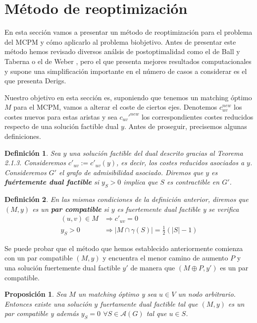 \documentclass[twoside,a4paper,openright,12pt,tikz]{book}
\newtheorem{defi}{Definici\'on}[section]
\newtheorem{prop}{Proposici\'on}[section]
\begin{document}
\section{Método de reoptimización}
En esta sección vamos a presentar un método de reoptimización para el problema del MCPM y cómo aplicarlo al problema biobjetivo. Antes de presentar este método hemos revisado diversos análsis de postoptimalidad como el de Ball y Taberna \cite{balltab} o el de Weber \cite{webber}, pero el que presenta mejores resultados computacionales y supone una simplificación importante en el número de casos a considerar es el que presenta Derigs. 

Nuestro objetivo en esta sección es, suponiendo que tenemos un matching óptimo $M$ para el MCPM, vamos a alterar el coste de ciertos ejes. Denotemos $c_{uv}^{new}$ los costes nuevos para estas aristas y sea $c_{uv}'^{new}$ los correspondientes costes reducidos respecto de una solución factible dual $y$. Antes de proseguir, precisemos algunas definiciones.
\begin{defi}
Sea $y$ una solución factible del dual descrito gracias al Teorema 2.1.3. Consideremos $c'_{uv}:=c'_{uv}(y)$, es decir, los costes reducidos asociados a $y$. Consideremos $G'$ el grafo de admisibilidad asociado. Diremos que $y$ es \textbf{fuértemente dual factible} si $y_S>0$ implica que $S$ es contractible en $G'$.
\end{defi}
\begin{defi}
En las mismas condiciones de la definición anterior, diremos que $(M,y)$ es un \textbf{par compatible} si $y$ es fuertemente dual factible y se verifica
\begin{align*}
(u,v)\in M &\Rightarrow c'_{uv} = 0\\
y_S>0&\Rightarrow |M\cap \gamma(S)| = \frac{1}{2}(|S|-1)
\end{align*}
\end{defi}
Se puede probar que el método que hemos establecido anteriormente comienza con un par compatible $(M,y)$ y encuentra el menor camino de aumento $P$ y una solución fuertemente dual factible $y'$ de manera que $(M\oplus P,y')$ es un par compatible.
\begin{prop}
Sea $M$ un matching óptimo y sea $u\in V$ un nodo arbitrario. Entonces existe una solución $y$ fuertamente dual factible tal que $(M,y)$ es un par compatible y además $y_S=0$ $\forall S \in \mathcal{A}(G)$ tal que $u \in S$.
\end{prop}
\end{document}
